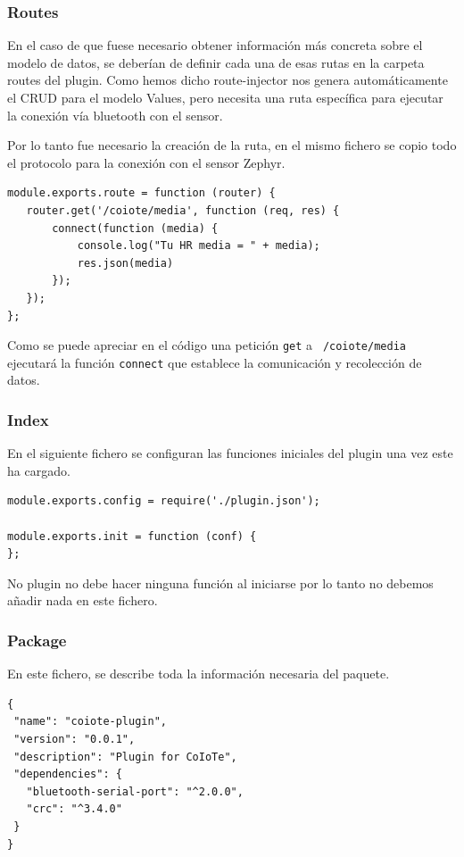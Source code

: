 \subsubsection{Routes}

En el caso de que fuese necesario obtener información más concreta sobre el
modelo de datos, se deberían de definir cada una de esas rutas en la carpeta
routes del plugin. Como hemos dicho route-injector nos genera automáticamente el CRUD para el modelo Values, pero necesita una ruta específica para ejecutar la conexión vía bluetooth con el sensor. 

Por lo tanto fue necesario la creación de la ruta, en el mismo fichero se copio todo el protocolo para la conexión con el sensor Zephyr. 

\begin{verbatim}
module.exports.route = function (router) {
   router.get('/coiote/media', function (req, res) {
       connect(function (media) {
           console.log("Tu HR media = " + media);
           res.json(media)
       });
   });
};
\end{verbatim}

Como se puede apreciar en el código una petición \texttt{get} a \texttt{ /coiote/media } ejecutará la función \texttt{connect} que establece la comunicación y recolección de datos.  

\subsubsection{Index}

En el siguiente fichero se configuran las funciones iniciales del plugin una vez
este ha cargado.

\begin{verbatim}
module.exports.config = require('./plugin.json');

module.exports.init = function (conf) { 
};
\end{verbatim}

No plugin no debe hacer ninguna función al iniciarse por lo tanto no debemos añadir nada en este fichero.
\pagebreak
\subsubsection{Package} 

En este fichero, se describe toda la información necesaria del paquete. 

\begin{verbatim}
{
 "name": "coiote-plugin",
 "version": "0.0.1",
 "description": "Plugin for CoIoTe",
 "dependencies": {
   "bluetooth-serial-port": "^2.0.0",
   "crc": "^3.4.0"
 }
}
\end{verbatim}

